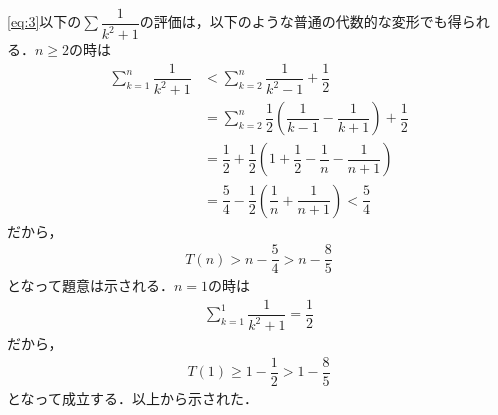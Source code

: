\documentclass[../../main.tex]{subfiles}
\begin{document}
\cref{eq:3}以下の$\sum \dfrac{1}{k^2+1}$の評価は，以下のような普通の代数的な変形でも得られる．$n \ge 2$の時は
\begin{align}
  \sum_{k=1}^n \dfrac{1}{k^2+1}
  &< \sum_{k=2}^n \dfrac{1}{k^2-1} + \dfrac{1}{2} \\
  & = \sum_{k=2}^n \dfrac{1}{2} \left( \dfrac{1}{k-1} - \dfrac{1}{k+1} \right) + \dfrac{1}{2} \\
  &= \dfrac{1}{2} + \dfrac{1}{2} \left( 1 + \dfrac{1}{2} - \dfrac{1}{n} - \dfrac{1}{n+1} \right) \\
  &= \dfrac{5}{4} - \dfrac{1}{2} \left( \dfrac{1}{n} + \dfrac{1}{n+1} \right) < \dfrac{5}{4}
\end{align}
だから，
\begin{align}
  T(n) > n - \dfrac{5}{4} > n - \dfrac{8}{5}
\end{align}
となって題意は示される．$n=1$の時は
\begin{align}
  \sum_{k=1}^{1} \dfrac{1}{k^2+1} = \dfrac{1}{2}
\end{align}
だから，
\begin{align}
  T(1) \ge 1 - \dfrac{1}{2} > 1-\dfrac{8}{5}
\end{align}
となって成立する．以上から示された．
\end{document}

